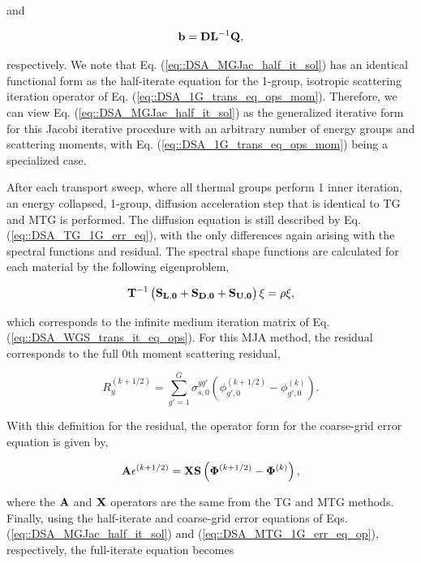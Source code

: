 \noindent and

\begin{equation}
\label{eq::DSA_MGJac_half_it_forcingfunc}
{\bf b} = {\bf D}{\bf L}^{-1}  {\bf Q} ,
\end{equation}

\noindent respectively. We note that Eq. (\ref{eq::DSA_MGJac_half_it_sol}) has an identical functional form as the half-iterate equation for the 1-group, isotropic scattering iteration operator of Eq. (\ref{eq::DSA_1G_trans_eq_ops_mom}). Therefore, we can view Eq. (\ref{eq::DSA_MGJac_half_it_sol}) as the generalized iterative form for this Jacobi iterative procedure with an arbitrary number of energy groups and scattering moments, with Eq. (\ref{eq::DSA_1G_trans_eq_ops_mom}) being a specialized case.

After each transport sweep, where all thermal groups perform 1 inner iteration, an energy collapsed, 1-group, diffusion acceleration step that is identical to TG and MTG is performed. The diffusion equation is still described by Eq. (\ref{eq::DSA_TG_1G_err_eq}), with the only differences again arising with the spectral functions and residual. The spectral shape functions are calculated for each material by the following eigenproblem,

\begin{equation}
\label{eq::DSA_WGS_eigenpprob}
{\bf T}^{-1} \left( {\bf S_{L,0}} + {\bf S_{D,0}}+ {\bf S_{U,0}} \right)\xi = \rho \xi ,
\end{equation}

\noindent which corresponds to the infinite medium iteration matrix of Eq. (\ref{eq::DSA_WGS_trans_it_eq_ops}). For this MJA method, the residual corresponds to the full 0th moment scattering residual,


\begin{equation}
\label{eq::DSA_WGS_diff_residual}
R_g^{(k+1/2)} = \sum_{g'=1}^G \sigma_{s,0}^{g g'} \left( \phi_{g',0}^{(k+1/2)} - \phi_{g',0}^{(k)} \right) .
\end{equation}

\noindent With this definition for the residual, the operator form for the coarse-grid error equation is given by,

\begin{equation}
\label{eq::DSA_MTG_1G_err_eq_op}
{\bf A} \epsilon^{(k+1/2)}  =  {\bf X} {\bf S} \left(  {\bf \Phi}^{(k+1/2)} - {\bf \Phi}^{(k)}  \right),
\end{equation}

\noindent where the ${\bf A}$ and ${\bf X}$ operators are the same from the TG and MTG methods. Finally, using the half-iterate and coarse-grid error equations of Eqs. (\ref{eq::DSA_MGJac_half_it_sol}) and (\ref{eq::DSA_MTG_1G_err_eq_op}), respectively, the full-iterate equation becomes 

